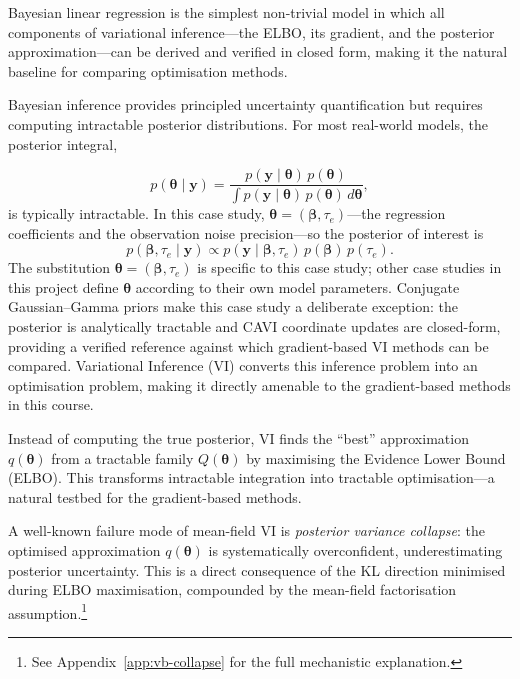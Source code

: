 \documentclass[11pt,a4paper]{article}
\begin{document}
Bayesian linear regression is the simplest non-trivial model in which all components
of variational inference---the ELBO, its gradient, and the posterior approximation---can
be derived and verified in closed form, making it the natural baseline for comparing
optimisation methods.

Bayesian inference provides principled uncertainty quantification but requires computing intractable posterior distributions. For most real-world models, the posterior integral,

\begin{equation*}
    p(\bm{\theta} \mid \bm{y}) = \frac{p(\bm{y} \mid \bm{\theta})\,p(\bm{\theta})}{\displaystyle\int p(\bm{y} \mid \bm{\theta})\,p(\bm{\theta})\, d\bm{\theta}},
\end{equation*}
\noindent 
is typically intractable.
In this case study, $\bm{\theta} = (\bm{\beta}, \tau_e)$---the regression coefficients
and the observation noise precision---so the posterior of interest is
\begin{equation*}
    p(\bm{\beta}, \tau_e \mid \bm{y}) \propto p(\bm{y} \mid \bm{\beta}, \tau_e)\,p(\bm{\beta})\,p(\tau_e).
\end{equation*}
The substitution $\bm{\theta} = (\bm{\beta}, \tau_e)$ is specific to this case study;
other case studies in this project define $\bm{\theta}$ according to their own model parameters.
Conjugate Gaussian--Gamma priors make this case study a deliberate exception: the posterior
is analytically tractable and CAVI coordinate updates are closed-form, providing a verified
reference against which gradient-based VI methods can be compared.
Variational Inference (VI) converts this inference problem into an optimisation problem, making it directly amenable to the gradient-based methods in this course.

Instead of computing the true posterior, VI finds the ``best'' approximation $q(\bm{\theta})$ from a tractable family $Q(\bm{\theta})$
by maximising the Evidence Lower Bound (ELBO). 
This transforms intractable integration into tractable optimisation---a natural testbed for the gradient-based methods.

A well-known failure mode of mean-field VI is \emph{posterior variance collapse}:
the optimised approximation $q(\bm{\theta})$ is systematically overconfident,
underestimating posterior uncertainty. This is a direct consequence of the KL direction minimised during ELBO maximisation,
compounded by the mean-field factorisation assumption.\footnote{See Appendix~\ref{app:vb-collapse} for the full mechanistic explanation.}
\end{document}
